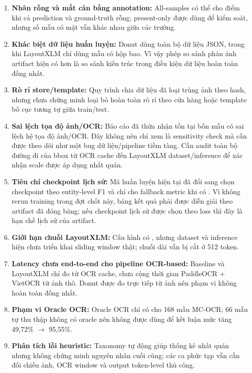 \begin{enumerate}
  \item \textbf{Nhãn rỗng và mất cân bằng annotation:} All-samples có thể cho điểm khi cả prediction và ground-truth rỗng; present-only được dùng để kiểm soát, nhưng số mẫu có mặt vẫn khác nhau giữa các trường.
  \item \textbf{Khác biệt dữ liệu huấn luyện:} Donut dùng toàn bộ dữ liệu JSON, trong khi LayoutXLM chỉ dùng mẫu có hộp bao. Vì vậy phép so sánh phản ánh artifact hiện có hơn là so sánh kiến trúc trong điều kiện dữ liệu hoàn toàn đồng nhất.
  \item \textbf{Rò rỉ store/template:} Quy trình chia dữ liệu đã loại trùng ảnh theo hash, nhưng chưa chứng minh loại bỏ hoàn toàn rò rỉ theo cửa hàng hoặc template bố cục tương tự giữa train/test.
  \item \textbf{Sai lệch tọa độ ảnh/OCR:} Báo cáo đã thừa nhận tồn tại bốn mẫu có sai lệch hệ tọa độ ảnh/OCR. Đây không nên chỉ xem là sensitivity check mà cần được theo dõi như một bug dữ liệu/pipeline tiềm tàng. Cần audit toàn bộ đường đi của bbox từ OCR cache đến LayoutXLM dataset/inference để xác nhận scale được áp dụng nhất quán.
  \item \textbf{Tiêu chí checkpoint lịch sử:} Mã huấn luyện hiện tại đã đổi sang chọn checkpoint theo entity-level F1 và chỉ cho fallback metric khi có . Vì không rerun training trong đợt chốt này, bảng kết quả phải được diễn giải theo artifact đã đóng băng; nếu checkpoint lịch sử được chọn theo loss thì đây là hạn chế lịch sử của artifact.
  \item \textbf{Giới hạn chuỗi LayoutXLM:} Cấu hình có , nhưng dataset và inference hiện chưa triển khai sliding window thật; chuỗi dài vẫn bị cắt ở 512 token.
  \item \textbf{Latency chưa end-to-end cho pipeline OCR-based:} Baseline và LayoutXLM chỉ đo từ OCR cache, chưa cộng thời gian PaddleOCR + VietOCR từ ảnh thô. Donut được đo trực tiếp từ ảnh nên phạm vi không hoàn toàn đồng nhất.
  \item \textbf{Phạm vi Oracle OCR:} Oracle OCR chỉ có cho 168 mẫu MC-OCR; 66 mẫu tự thu thập không có oracle nên không được dùng để kết luận mức tăng 49,72\% $\rightarrow$ 95,55\%.
  \item \textbf{Phân tích lỗi heuristic:} Taxonomy tự động giúp thống kê nhất quán nhưng không chứng minh nguyên nhân cuối cùng; các ca phức tạp vẫn cần đối chiếu ảnh, OCR window và output token-level thủ công.
\end{enumerate}

